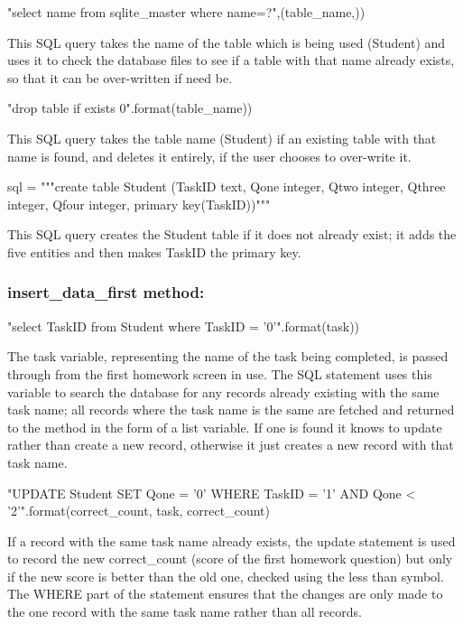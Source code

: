 \begin{python}
"select name from sqlite_master where name=?",(table_name,))
\end{python}

This SQL query takes the name of the table which is being used (Student) and uses it to check the database files to see if a table with that name already exists, so that it can be over-written if need be.

\begin{python}
"drop table if exists {0}".format(table_name))
\end{python}

This SQL query takes the table name (Student) if an existing table with that name is found, and deletes it entirely, if the user chooses to over-write it.

\begin{python}
sql = """create table Student
	(TaskID text,
	Qone integer,
	Qtwo integer,
	Qthree integer,
	Qfour integer,
	primary key(TaskID))"""
\end{python}

This SQL query creates the Student table if it does not already exist; it adds the five entities and then makes TaskID the primary key.

\subsubsection{insert\_data\_first method: }

\begin{python}
"select TaskID from Student where TaskID = '{0}'".format(task))
\end{python}

The task variable, representing the name of the task being completed, is passed through from the first homework screen in use. The SQL statement uses this variable to search the database for any records already existing with the same task name; all records where the task name is the same are fetched and returned to the method in the form of a list variable. If one is found it knows to update rather than create a new record, otherwise it just creates a new record with that task name.

\begin{python}
"UPDATE Student SET Qone = '{0}' WHERE TaskID = '{1}' AND Qone < '{2}'".format(correct_count, task, correct_count)
\end{python}

If a record with the same task name already exists, the update statement is used to record the new correct\_count (score of the first homework question) but only if the new score is better than the old one, checked using the less than symbol. The WHERE part of the statement ensures that the changes are only made to the one record with the same task name rather than all records.

